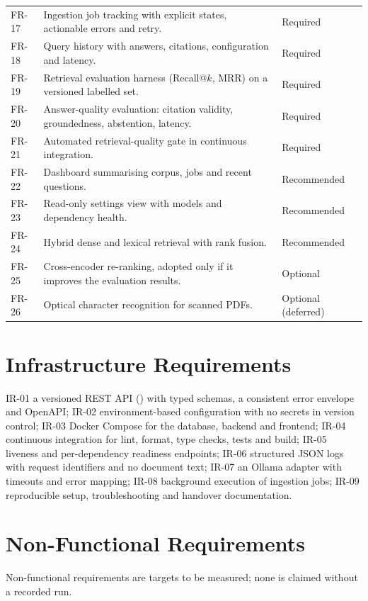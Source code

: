 {\begin{longtable}{@{}p{1.2cm}p{9.0cm}p{2.2cm}@{}}
  FR-17 & Ingestion job tracking with explicit states, actionable errors and retry. & Required \\
  FR-18 & Query history with answers, citations, configuration and latency. & Required \\
  FR-19 & Retrieval evaluation harness (Recall@$k$, MRR) on a versioned labelled set. & Required \\
  FR-20 & Answer-quality evaluation: citation validity, groundedness, abstention, latency. & Required \\
  FR-21 & Automated retrieval-quality gate in continuous integration. & Required \\
  FR-22 & Dashboard summarising corpus, jobs and recent questions. & Recommended \\
  FR-23 & Read-only settings view with models and dependency health. & Recommended \\
  FR-24 & Hybrid dense and lexical retrieval with rank fusion. & Recommended \\
  FR-25 & Cross-encoder re-ranking, adopted only if it improves the evaluation results. & Optional \\
  FR-26 & Optical character recognition for scanned PDFs. & Optional (deferred) \\
  \bottomrule
\end{longtable}
}

\section{Infrastructure Requirements}

IR-01 a versioned REST API () with typed schemas, a consistent error envelope and OpenAPI;
IR-02 environment-based configuration with no secrets in version control; IR-03 Docker Compose for the database,
backend and frontend; IR-04 continuous integration for lint, format, type checks, tests and build; IR-05 liveness
and per-dependency readiness endpoints; IR-06 structured JSON logs with request identifiers and no document text;
IR-07 an Ollama adapter with timeouts and error mapping; IR-08 background execution of ingestion jobs; IR-09
reproducible setup, troubleshooting and handover documentation.

\section{Non-Functional Requirements}

Non-functional requirements are targets to be measured; none is claimed without a recorded run.

